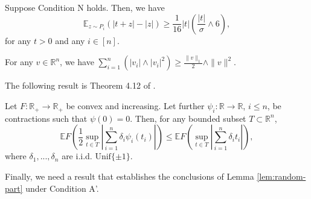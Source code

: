 \begin{lemma}\label{lem:link-to-loss}
Suppose Condition N holds. Then, we have
$$\mathbb{E}_{z\sim P_i}\left(|t+z|-|z|\right) \geq \frac{1}{16}|t|\left(\frac{|t|}{\sigma}\wedge 6\right),$$
for any $t>0$ and any $i\in[n]$.
\end{lemma}

\begin{lemma}
For any $v\in\mathbb{R}^n$, we have $\sum_{i=1}^n\left(|v_i|\wedge |v_i|^2\right)\geq \frac{\|v\|_1}{2}\wedge \|v\|^2$.
\end{lemma}

The following result is Theorem 4.12 of \cite{ledoux2013probability}.

\begin{lemma}\label{lem:contraction}
Let $F:\mathbb{R}_+\rightarrow\mathbb{R}_+$ be convex and increasing. Let further $\psi_i:\mathbb{R}\rightarrow\mathbb{R}$, $i\leq n$, be contractions such that $\psi(0)=0$. Then, for any bounded subset $T\subset\mathbb{R}^n$,
$$\mathbb{E}F\left(\frac{1}{2}\sup_{t\in T}\left|\sum_{i=1}^n\delta_i\psi_i(t_i)\right|\right)\leq \mathbb{E}F\left(\sup_{t\in T}\left|\sum_{i=1}^n\delta_i t_i\right|\right),$$
where $\delta_1,...,\delta_n$ are i.i.d. $\text{Unif}\{\pm 1\}$.
\end{lemma}


Finally, we need a result that establishes the conclusions of Lemma \ref{lem:random-part} under Condition A'.

